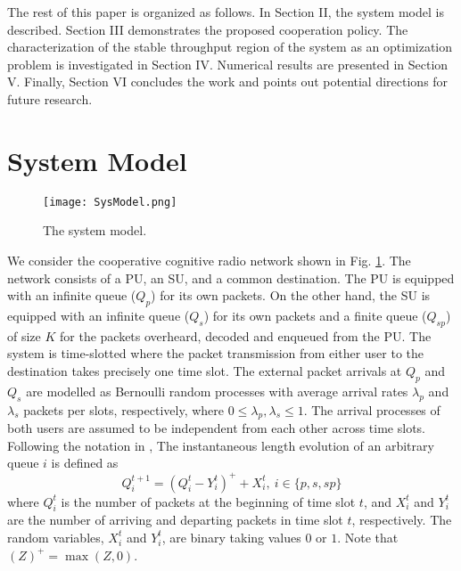 \documentclass[conference]{IEEEtran}
\begin{document}
The rest of this paper is organized as follows. In Section II,
the system model is described. Section III demonstrates the proposed
cooperation policy. The characterization of the stable
throughput region of the system as an optimization problem is investigated
in Section IV. Numerical results are presented in Section V.
Finally, Section VI concludes the work and points out potential 
directions for future research.

\section{System Model}
\begin{figure}
\centering
\texttt{[image: SysModel.png]}
\caption{The system model.}
\label{fig:SysModel}
\end{figure}
We consider the cooperative cognitive radio network shown in Fig.
\ref{fig:SysModel}. The network consists of a PU, an SU, and a
common destination. The PU is equipped with an infinite queue
($Q_p$) for its own packets. On the other hand, the SU is equipped
with an infinite queue ($Q_s$) for its own packets and a finite
queue ($Q_{sp}$) of size $K$ for the packets overheard, decoded and enqueued from the PU.
The system is time-slotted where the packet transmission from
either user to the destination takes precisely one time slot. The
external packet arrivals at $Q_p$ and $Q_s$ are modelled as
Bernoulli random processes with average arrival rates $\lambda_p$ and $\lambda_s$
packets per slots, respectively, where $0 \le \lambda_p, \lambda_s \le 1$.
The arrival processes of both users are assumed to
be independent from each other across time slots. Following the notation in 
\cite{Ashour_Journal}, The instantaneous length evolution of an arbitrary 
queue $i$ is defined as
\begin{equation}
Q_i^{t+1} = \left(Q_i^t - Y_i^t\right)^+ + X_i^t, \: i \in \{ p,
s, sp \}
\end{equation}
where $Q_i^t$ is the number of packets at the beginning of 
time slot $t$, and $X_i^t$ and $Y_i^t$ are the number
of arriving and departing packets in time slot $t$, respectively. 
The random variables, $X_i^t$ and $Y_i^t$, are binary taking 
values $0$ or $1$. Note that $(Z)^+ = \max(Z,0)$.
\end{document}
